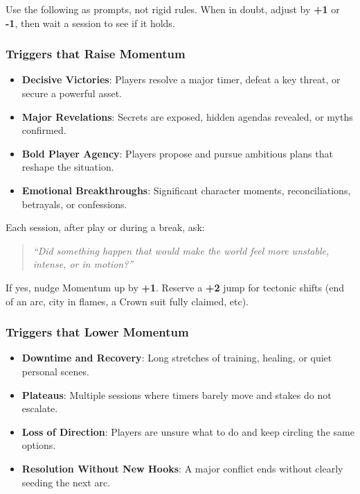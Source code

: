\documentclass[11pt]{article}
\begin{document}
Use the following as prompts, not rigid rules. When in doubt, adjust by \textbf{+1} or \textbf{-1}, then wait a session to see if it holds.

\subsubsection{Triggers that Raise Momentum}

\begin{itemize}
  \item \textbf{Decisive Victories}: Players resolve a major timer, defeat a key threat, or secure a powerful asset.
  \item \textbf{Major Revelations}: Secrets are exposed, hidden agendas revealed, or myths confirmed.
  \item \textbf{Bold Player Agency}: Players propose and pursue ambitious plans that reshape the situation.
  \item \textbf{Emotional Breakthroughs}: Significant character moments, reconciliations, betrayals, or confessions.
\end{itemize}

Each session, after play or during a break, ask:
\begin{quote}
\emph{``Did something happen that would make the world feel more unstable, intense, or in motion?''}
\end{quote}
If yes, nudge Momentum up by \textbf{+1}. Reserve a \textbf{+2} jump for tectonic shifts (end of an arc, city in flames, a Crown suit fully claimed, etc).

\subsubsection{Triggers that Lower Momentum}

\begin{itemize}
  \item \textbf{Downtime and Recovery}: Long stretches of training, healing, or quiet personal scenes.
  \item \textbf{Plateaus}: Multiple sessions where timers barely move and stakes do not escalate.
  \item \textbf{Loss of Direction}: Players are unsure what to do and keep circling the same options.
  \item \textbf{Resolution Without New Hooks}: A major conflict ends without clearly seeding the next arc.
\end{itemize}
\end{document}
